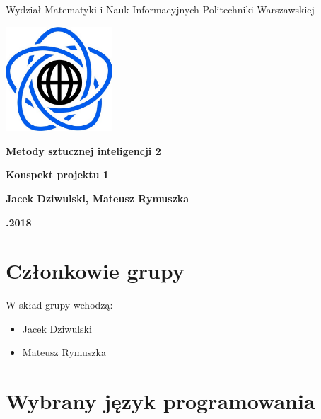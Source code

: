 \documentclass[10pt,a4paper]{article}
\begin{document}
\begin{titlepage}
\begin{center}
{\fontsize{14}{12}\selectfont Wydział Matematyki i Nauk Informacyjnych Politechniki Warszawskiej}

\end{center}

\vspace{1cm}
\begin{center}
\includegraphics[width=0.3\textwidth]{images/logo.png}
\end{center}
\vspace{3cm}

\begin{center}
\textbf{{\fontsize{26}{12}\selectfont Metody sztucznej inteligencji 2}}

\vspace{2cm}
\textbf{{\fontsize{22}{12}\selectfont Konspekt projektu 1}}
\vspace{1cm}

\textbf{{\fontsize{13.5}{12}\selectfont Jacek Dziwulski, Mateusz Rymuszka}}

\vspace{6cm}
\textbf{{\fontsize{13.5}{12}.2018}}
\end{center}  
\end{titlepage}

\section{Członkowie grupy}

W skład grupy wchodzą:

\begin{itemize}
\item Jacek Dziwulski
\item Mateusz Rymuszka
\end{itemize}

\section{Wybrany język programowania}
\end{document}
